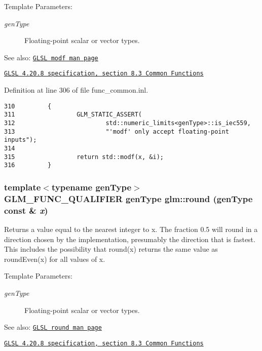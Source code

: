 \begin{Desc}
\item[Template Parameters:]
\begin{description}
\item[{\em genType}]Floating-point scalar or vector types.\end{description}
\end{Desc}
\begin{Desc}
\item[See also:]\href{http://www.opengl.org/sdk/docs/manglsl/xhtml/modf.xml}{\tt GLSL modf man page} 

\href{http://www.opengl.org/registry/doc/GLSLangSpec.4.20.8.pdf}{\tt GLSL 4.20.8 specification, section 8.3 Common Functions} \end{Desc}


Definition at line 306 of file func\_\-common.inl.

\begin{Code}\begin{verbatim}310         {
311                 GLM_STATIC_ASSERT(
312                         std::numeric_limits<genType>::is_iec559,
313                         "'modf' only accept floating-point inputs");
314 
315                 return std::modf(x, &i);
316         }
\end{verbatim}
\end{Code}


\hypertarget{group__core__func__common_g931fae510be1b98fe22646fc649a50d2}{
\subsubsection[round]{\setlength{\rightskip}{0pt plus 5cm}template$<$typename genType$>$ GLM\_\-FUNC\_\-QUALIFIER genType glm::round (genType const \& {\em x})}}
\label{group__core__func__common_g931fae510be1b98fe22646fc649a50d2}


Returns a value equal to the nearest integer to x. The fraction 0.5 will round in a direction chosen by the implementation, presumably the direction that is fastest. This includes the possibility that round(x) returns the same value as roundEven(x) for all values of x.

\begin{Desc}
\item[Template Parameters:]
\begin{description}
\item[{\em genType}]Floating-point scalar or vector types.\end{description}
\end{Desc}
\begin{Desc}
\item[See also:]\href{http://www.opengl.org/sdk/docs/manglsl/xhtml/round.xml}{\tt GLSL round man page} 

\href{http://www.opengl.org/registry/doc/GLSLangSpec.4.20.8.pdf}{\tt GLSL 4.20.8 specification, section 8.3 Common Functions} \end{Desc}


